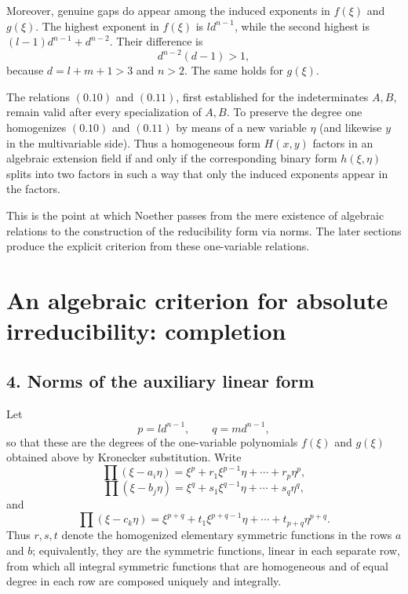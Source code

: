 \documentclass[11pt]{article}
\begin{document}
Moreover, genuine gaps do appear among the induced exponents in $f(\xi)$ and $g(\xi)$. The highest exponent in $f(\xi)$ is $l d^{n-1}$, while the second highest is $(l-1)d^{n-1}+d^{n-2}$. Their difference is
\[
d^{n-2}(d-1)>1,
\]
because $d=l+m+1>3$ and $n>2$. The same holds for $g(\xi)$.

The relations \((0.10)\) and \((0.11)\), first established for the indeterminates $A,B$, remain valid after every specialization of $A,B$. To preserve the degree one homogenizes \((0.10)\) and \((0.11)\) by means of a new variable $\eta$ (and likewise $y$ in the multivariable side). Thus a homogeneous form $H(x,y)$ factors in an algebraic extension field if and only if the corresponding binary form $h(\xi,\eta)$ splits into two factors in such a way that only the induced exponents appear in the factors.

This is the point at which Noether passes from the mere existence of algebraic relations to the construction of the reducibility form via norms. The later sections produce the explicit criterion from these one-variable relations.

\clearpage

\section{An algebraic criterion for absolute irreducibility: completion}

\subsection*{4. Norms of the auxiliary linear form}

Let
\[
  p = l d^{n-1}, \qquad q = m d^{n-1},
\]
so that these are the degrees of the one-variable polynomials $f(\xi)$ and $g(\xi)$ obtained above by Kronecker substitution. Write
\[
  \prod (\xi-a_i\eta)=\xi^p+r_1\xi^{p-1}\eta+\cdots+r_p\eta^p,
\]
\[
  \prod (\xi-b_j\eta)=\xi^q+s_1\xi^{q-1}\eta+\cdots+s_q\eta^q,
\]
and
\[
  \prod (\xi-c_k\eta)=\xi^{p+q}+t_1\xi^{p+q-1}\eta+\cdots+t_{p+q}\eta^{p+q}.
\]
Thus $r,s,t$ denote the homogenized elementary symmetric functions in the rows $a$ and $b$; equivalently, they are the symmetric functions, linear in each separate row, from which all integral symmetric functions that are homogeneous and of equal degree in each row are composed uniquely and integrally.
\end{document}
